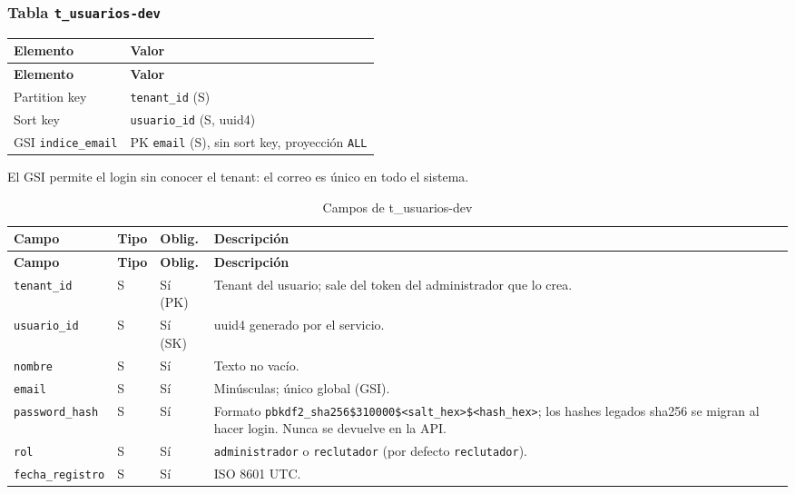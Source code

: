 \subsubsection{Tabla \texttt{t\_usuarios-dev}}
\begin{longtable}{p{3.5cm}p{10.5cm}}
\toprule
\textbf{Elemento} & \textbf{Valor} \\
\midrule
\endfirsthead
\toprule
\textbf{Elemento} & \textbf{Valor} \\
\midrule
\endhead
\bottomrule
\endlastfoot
Partition key & \texttt{tenant\_\allowbreak{}id} (S) \\
Sort key & \texttt{usuario\_\allowbreak{}id} (S, uuid4) \\
GSI \texttt{indice\_\allowbreak{}email} & PK \texttt{email} (S), sin sort key, proyección \texttt{ALL} \\
\end{longtable}

El GSI permite el login sin conocer el tenant: el correo es único en todo el sistema.

\begin{longtable}{p{3.4cm}p{1.2cm}p{1.4cm}p{8cm}}
\caption{Campos de t\_usuarios-dev}\\
\toprule
\textbf{Campo} & \textbf{Tipo} & \textbf{Oblig.} & \textbf{Descripción} \\
\midrule
\endfirsthead
\toprule
\textbf{Campo} & \textbf{Tipo} & \textbf{Oblig.} & \textbf{Descripción} \\
\midrule
\endhead
\bottomrule
\endlastfoot
\texttt{tenant\_\allowbreak{}id} & S & Sí (PK) & Tenant del usuario; sale del token del administrador que lo crea. \\
\texttt{usuario\_\allowbreak{}id} & S & Sí (SK) & uuid4 generado por el servicio. \\
\texttt{nombre} & S & Sí & Texto no vacío. \\
\texttt{email} & S & Sí & Minúsculas; único global (GSI). \\
\texttt{password\_\allowbreak{}hash} & S & Sí & Formato \texttt{pbkdf2\_\allowbreak{}sha256\$310000\$\textless{}salt\_\allowbreak{}hex\textgreater{}\$\textless{}hash\_\allowbreak{}hex\textgreater{}}; los hashes legados sha256 se migran al hacer login. Nunca se devuelve en la API. \\
\texttt{rol} & S & Sí & \texttt{administrador} o \texttt{reclutador} (por defecto \texttt{reclutador}). \\
\texttt{fecha\_\allowbreak{}registro} & S & Sí & ISO 8601 UTC. \\
\end{longtable}

